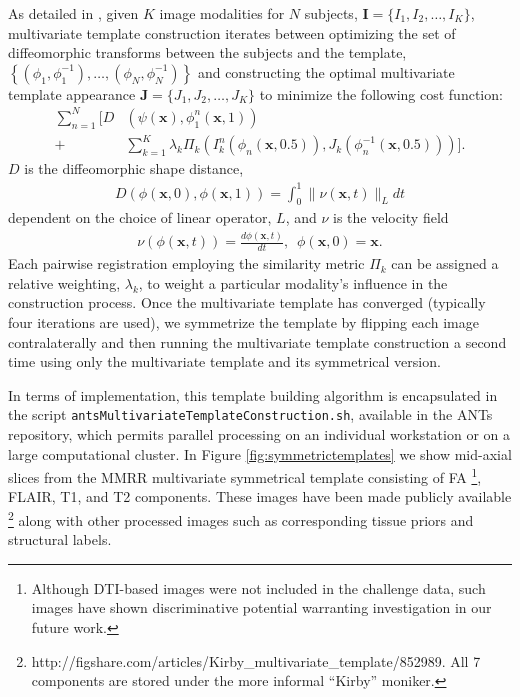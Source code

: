 \documentclass[final,5p,times,twocolumn]{elsarticle}
\begin{document}
As detailed in \cite{avants2008,avants2010}, 
given $K$ image modalities for $N$ subjects,  
${\mathbf I} = \{I_1,I_2,\ldots, I_K\}$, multivariate 
template construction iterates between optimizing the set 
of diffeomorphic transforms between the subjects and the 
template, 
$\left\{\left(\phi_1,\phi_1^{-1}\right),\ldots,\left(\phi_N,\phi_N^{-1}\right)\right\}$ 
and constructing the 
optimal multivariate template appearance 
$\mathbf{J}=\{J_1,J_2,\ldots, J_K\}$ to minimize the
following cost function:
\begin{align}
  \sum_{n=1}^N 
        \Bigg[ D &\left( \psi(\mathbf{x}),\phi_1^n(\mathbf{x},1)\right) \\ \nonumber 
        +& \sum_{k=1}^K \lambda_k \Pi_k \left(I_k^n\left(\phi_n(\mathbf{x},0.5)\right),J_k\left(\phi^{-1}_n(\mathbf{x},0.5)\right)\right)\Bigg].
\end{align}
$D$ is the diffeomorphic shape distance,
\begin{align}
D\left( \phi( \mathbf{x},0),\phi( \mathbf{x},1)\right) = \int_0^1 \| \nu(\mathbf{x},t)\|_L dt
\end{align}
dependent on the choice of linear operator, $L$, and $\nu$
is the velocity field
\begin{align}
\nu\left( \phi(\mathbf{x},t) \right) = \frac{d\phi(\mathbf{x},t)}{dt},\,\,\, \phi(\mathbf{x},0) = \mathbf{x}.
\end{align}
Each pairwise registration employing the similarity metric $\Pi_k$ can 
be assigned a relative weighting, $\lambda_k$, to weight a particular
modality's influence in the construction process.  Once the multivariate
template has converged (typically four iterations are used), we symmetrize
the template by flipping each image contralaterally and then running the
multivariate template construction a second time using only the multivariate
template and its symmetrical version.

In terms of implementation, this template building algorithm is 
encapsulated in the script \verb#antsMultivariateTemplateConstruction.sh#,
available in the ANTs repository, which permits parallel processing on
an individual workstation or on a large computational cluster.  In
Figure \ref{fig:symmetrictemplates} we show mid-axial slices from
the MMRR multivariate symmetrical template consisting of FA%
\footnote{
Although DTI-based images were not included in the
challenge data, such images have shown discriminative potential 
\citep[e.g.,][]{price2003} warranting investigation in our future
work.  
}, FLAIR,  
T1, and T2 components.  These images have been made publicly available%
\footnote{
http://figshare.com/articles/Kirby\_multivariate\_template/852989.
All 7 components are stored under the more informal ``Kirby'' moniker.
}
along with other processed images such as corresponding
tissue priors and structural labels.
\end{document}
